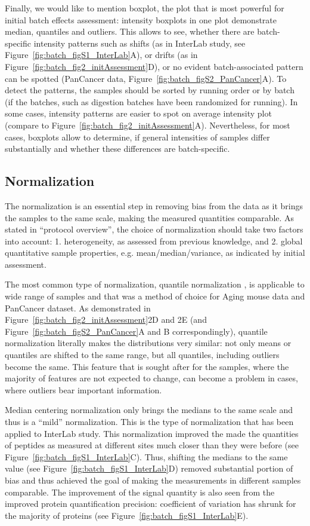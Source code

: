 \documentclass[num-refs]{wiley-article}
\begin{document}
Finally, we would like to mention boxplot, the plot that is most powerful for initial batch effects assessment: intensity boxplots in one plot demonstrate median, quantiles and outliers. This allows to see, whether there are batch-specific intensity patterns such as shifts (as in InterLab study, see Figure~\ref{fig:batch_figS1_InterLab}A), or drifts (as in Figure~\ref{fig:batch_fig2_initAssessment}D), or no evident batch-associated pattern can be spotted (PanCancer data, Figure~\ref{fig:batch_figS2_PanCancer}A). To detect the patterns, the samples should be sorted by running order or by batch (if the batches, such as digestion batches have been randomized for running). In some cases, intensity patterns are easier to spot on average intensity plot (compare to Figure~\ref{fig:batch_fig2_initAssessment}A). Nevertheless, for most cases, boxplots allow to determine, if general intensities of samples differ substantially and whether these differences are batch-specific.

\subsection{Normalization}

The normalization is an essential step in removing bias from the data as it brings the samples to the same scale, making the measured quantities comparable. As stated in “protocol overview”, the choice of normalization should take two factors into account: 
1. heterogeneity, as assessed from previous knowledge, and 2. global quantitative sample properties, e.g. mean/median/variance, as indicated by initial assessment.

The most common type of normalization, quantile normalization \cite{Bolstad2003}, is applicable to wide range of samples and that was a method of choice for Aging mouse data and PanCancer dataset. As demonstrated in Figure~\ref{fig:batch_fig2_initAssessment}2D and 2E (and Figure~\ref{fig:batch_figS2_PanCancer}A and B correspondingly), quantile normalization literally makes the distributions very similar: not only means or quantiles are shifted to the same range, but all quantiles, including outliers become the same. This feature that is sought after for the samples, where the majority of features are not expected to change, can become a problem in cases, where outliers bear important information.

Median centering normalization only brings the medians to the same scale and thus is a “mild” normalization. This is the type of normalization that has been applied to InterLab study. This normalization improved the made the quantities of peptides as measured at different sites much closer than they were before (see Figure~\ref{fig:batch_figS1_InterLab}C). Thus, shifting the medians to the same value (see Figure~\ref{fig:batch_figS1_InterLab}D) removed substantial portion of bias and thus achieved the goal of making the measurements in different samples comparable. The improvement of the signal quantity is also seen from the improved protein quantification precision: coefficient of variation has shrunk for the majority of proteins (see Figure~\ref{fig:batch_figS1_InterLab}E).
\end{document}
